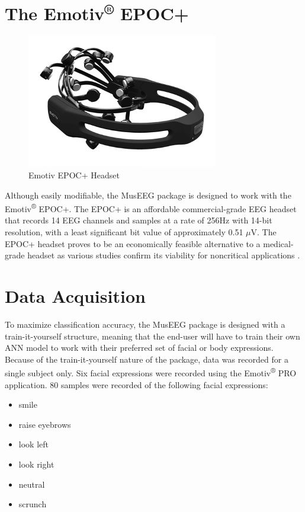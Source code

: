 \section{The Emotiv\textsuperscript{®} EPOC+}
\begin{figure}[htbp]
	\centering
		\includegraphics[width=0.5\columnwidth]{epoc.png}
	\caption{Emotiv EPOC+ Headset}
	\label{fig:epoc}
\end{figure}

Although easily modifiable, the MusEEG package is designed to work with the Emotiv\textsuperscript{®} EPOC+. The EPOC+ is an affordable commercial-grade EEG headset that records 14 EEG channels and samples at a rate of 256Hz with 14-bit resolution, with a least significant bit value of approximately 0.51 $\mu$V. The EPOC+ headset proves to be an economically feasible alternative to a medical-grade headset as various studies confirm its viability for noncritical applications \cite{10, 11, 12, 13}.  

\section{Data Acquisition}
To maximize classification accuracy, the MusEEG package is designed with a train-it-yourself structure, meaning that the end-user will have to train their own ANN model to work with their preferred set of facial or body expressions. Because of the train-it-yourself nature of the package, data was recorded for a single subject only. Six facial expressions were recorded using the Emotiv\textsuperscript{®} PRO application. 80 samples were recorded of the following facial expressions: 
\begin{itemize}
\item smile
\item raise eyebrows
\item look left
\item look right
\item neutral
\item scrunch
\end{itemize}

